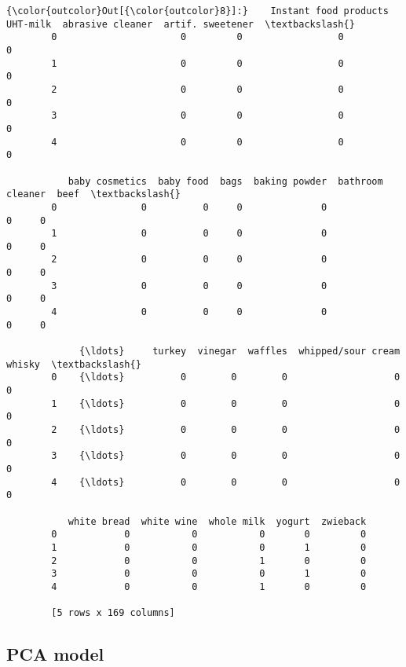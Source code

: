 \documentclass[11pt]{article}
\begin{document}
\begin{Verbatim}[commandchars=\\\{\}]
{\color{outcolor}Out[{\color{outcolor}8}]:}    Instant food products  UHT-milk  abrasive cleaner  artif. sweetener  \textbackslash{}
        0                      0         0                 0                 0   
        1                      0         0                 0                 0   
        2                      0         0                 0                 0   
        3                      0         0                 0                 0   
        4                      0         0                 0                 0   
        
           baby cosmetics  baby food  bags  baking powder  bathroom cleaner  beef  \textbackslash{}
        0               0          0     0              0                 0     0   
        1               0          0     0              0                 0     0   
        2               0          0     0              0                 0     0   
        3               0          0     0              0                 0     0   
        4               0          0     0              0                 0     0   
        
             {\ldots}     turkey  vinegar  waffles  whipped/sour cream  whisky  \textbackslash{}
        0    {\ldots}          0        0        0                   0       0   
        1    {\ldots}          0        0        0                   0       0   
        2    {\ldots}          0        0        0                   0       0   
        3    {\ldots}          0        0        0                   0       0   
        4    {\ldots}          0        0        0                   0       0   
        
           white bread  white wine  whole milk  yogurt  zwieback  
        0            0           0           0       0         0  
        1            0           0           0       1         0  
        2            0           0           1       0         0  
        3            0           0           0       1         0  
        4            0           0           1       0         0  
        
        [5 rows x 169 columns]
\end{Verbatim}
            
    \subsection{PCA model}\label{pca-model}
\end{document}
